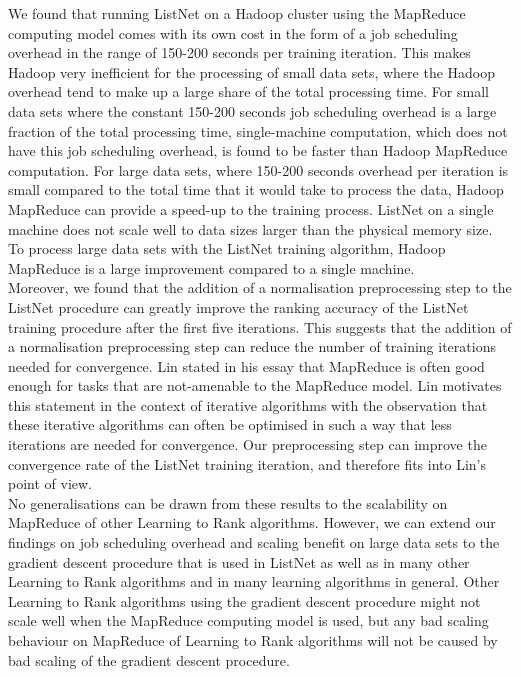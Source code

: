 We found that running ListNet on a Hadoop cluster using the MapReduce computing model comes with its own cost in the form of a job scheduling overhead in the range of 150-200 seconds per training iteration. This makes Hadoop very inefficient for the processing of small data sets, where the Hadoop overhead tend to make up a large share of the total processing time. For small data sets where the constant 150-200 seconds job scheduling overhead is a large fraction of the total processing time, single-machine computation, which does not have this job scheduling overhead, is found to be faster than Hadoop MapReduce computation. For large data sets, where 150-200 seconds overhead per iteration is small compared to the total time that it would take to process the data, Hadoop MapReduce can provide a speed-up to the training process. ListNet on a single machine does not scale well to data sizes larger than the physical memory size. To process large data sets with the ListNet training algorithm, Hadoop MapReduce is a large improvement compared to a single machine.\\

Moreover, we found that the addition of a normalisation preprocessing step to the ListNet procedure can greatly improve the ranking accuracy of the ListNet training procedure after the first five iterations. This suggests that the addition of a normalisation preprocessing step can reduce the number of training iterations needed for convergence. Lin stated in his essay \cite{Lin2013} that MapReduce is often good enough for tasks that are not-amenable to the MapReduce model. Lin motivates this statement in the context of iterative algorithms with the observation that these iterative algorithms can often be optimised in such a way that less iterations are needed for convergence. Our preprocessing step can improve the convergence rate of the ListNet training iteration, and therefore fits into Lin's point of view.\\

No generalisations can be drawn from these results to the scalability on MapReduce of other Learning to Rank algorithms. However, we can extend our findings on job scheduling overhead and scaling benefit on large data sets to the gradient descent procedure that is used in ListNet as well as in many other Learning to Rank algorithms and in many learning algorithms in general. Other Learning to Rank algorithms using the gradient descent procedure might not scale well when the MapReduce computing model is used, but any bad scaling behaviour on MapReduce of Learning to Rank algorithms will not be caused by bad scaling of the gradient descent procedure.


